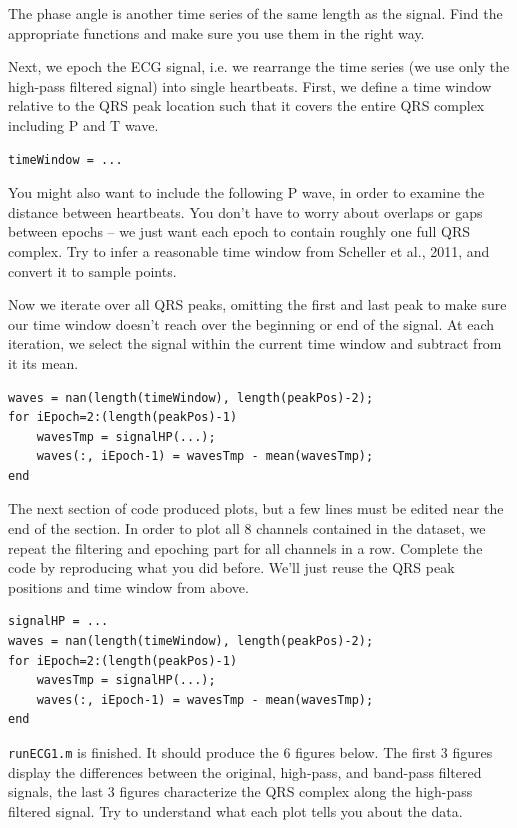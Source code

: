 \documentclass[10pt,a4paper,notitlepage]{report}
\begin{document}
The phase angle is another time series of the same length as the signal. Find the appropriate functions and make sure you use them in the right way.

Next, we epoch the ECG signal, i.e. we rearrange the time series (we use only the high-pass filtered signal) into single heartbeats. First, we define a time window relative to the QRS peak location such that it covers the entire QRS complex including P and T wave.

\begin{verbatim}
timeWindow = ...
\end{verbatim}

You might also want to include the following P wave, in order to examine the distance between heartbeats. You don't have to worry about overlaps or gaps between epochs – we just want each epoch to contain roughly one full QRS complex. Try to infer a reasonable time window from Scheller et al., 2011, and convert it to sample points.

Now we iterate over all QRS peaks, omitting the first and last peak to make sure our time window doesn't reach over the beginning or end of the signal. At each iteration, we select the signal within the current time window and subtract from it its mean.

\begin{verbatim}
waves = nan(length(timeWindow), length(peakPos)-2);
for iEpoch=2:(length(peakPos)-1)
    wavesTmp = signalHP(...);
    waves(:, iEpoch-1) = wavesTmp - mean(wavesTmp);
end
\end{verbatim}

The next section of code produced plots, but a few lines must be edited near the end of the section. In order to plot all 8 channels contained in the dataset, we repeat the filtering and epoching part for all channels in a row. Complete the code by reproducing what you did before. We'll just reuse the QRS peak positions and time window from above.

\begin{verbatim}
signalHP = ... 
waves = nan(length(timeWindow), length(peakPos)-2);
for iEpoch=2:(length(peakPos)-1)
    wavesTmp = signalHP(...);
    waves(:, iEpoch-1) = wavesTmp - mean(wavesTmp);
end
\end{verbatim}

\texttt{runECG1.m} is finished. It should produce the 6 figures below. The first 3 figures display the differences between the original, high-pass, and band-pass filtered signals, the last 3 figures characterize the QRS complex along the high-pass filtered signal. Try to understand what each plot tells you about the data.
\end{document}
